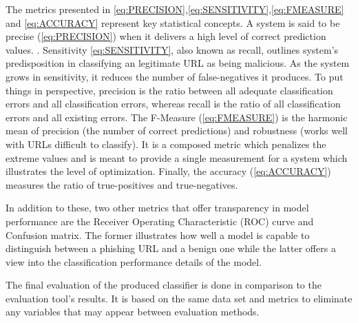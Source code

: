 The metrics presented in \ref{eq:PRECISION},\ref{eq:SENSITIVITY},\ref{eq:FMEASURE} and \ref{eq:ACCURACY} represent key statistical concepts. A system is said to be precise (\ref{eq:PRECISION}) when it delivers a high level of correct prediction values. . Sensitivity \ref{eq:SENSITIVITY}, also known as recall, outlines system's predisposition in classifying an legitimate URL as being malicious. As the system grows in sensitivity, it reduces the number of false-negatives it produces. To put things in perspective, precision is the ratio between all adequate classification errors and all classification errors, whereas recall is the ratio of all classification errors and all existing errors.
The F-Measure (\ref{eq:FMEASURE}) is the harmonic mean of precision (the number of correct predictions) and robustness (works well with URLs difficult to classify). It is a composed metric which penalizes the extreme values and is meant to provide a single measurement for a system which illustrates the level of optimization. Finally, the accuracy (\ref{eq:ACCURACY}) measures the ratio of true-positives and true-negatives.

In addition to these, two other metrics that offer transparency in model performance are the Receiver Operating Characteristic (ROC) curve and Confusion matrix. The former illustrates how well a model is capable to distinguish between a phishing URL and a benign one while the latter offers a view into the classification performance details of the model.

The final evaluation of the produced classifier is done in comparison to the evaluation tool's results. It is based on the same data set and metrics to eliminate any variables that may appear between evaluation methods.

\iffalse
	1st module Whitelist/Blacklist
	Hash urls and do lookups as cheap as possible
	2nd module Heuristics
	Compile a set of heuristics from the papers based on performance
	3rd module Visual similarity/Content evaluation
	Think about studying the visual similarity or some content evaluation if feasible
	4th module Machine learning
	use Cohen's kappa static to measure agreement between stacked machine learning algos
	URL classifier (supervised learning)
	Domain classifier (trained with https://github.com/elceef/dnstwist)
	DGA classifier (optional)

	Figures must be correctly numbered with captions and paragraph text should not be wrapped around figures - same rules apply to tables. An example of figures can be found below.
	\begin{figure}[t]
		\centering
		\texttt{[image: unilogo.jpg]}
		\caption{Bournemouth University}
		\label{fig:BULogo3}
	\end{figure}
	You should always start with an overview (Heading 2 style) to tell what this chapter is about and finkish with a summary (Heading 2 style) to tell what has been covered in this chapter.

	This chapter is about discussing your project planning and methodology. Note that your chosen methodology should be based on the constraints and complexity of your project instead of some common senses with no link to your own project.]
\fi